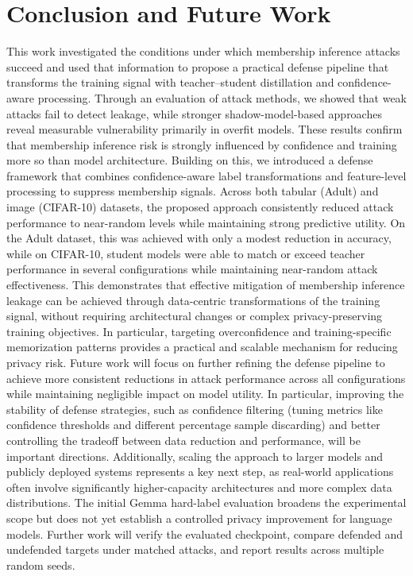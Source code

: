 \documentclass[conference]{IEEEtran}
\begin{document}
\section{Conclusion and Future Work}
This work investigated the conditions under which membership inference attacks succeed and used that information to propose a practical defense pipeline that transforms the training signal with teacher--student distillation and confidence-aware processing. Through an evaluation of attack methods, we showed that weak attacks fail to detect leakage, while stronger shadow-model-based approaches reveal measurable vulnerability primarily in overfit models. These results confirm that membership inference risk is strongly influenced by confidence and training more so than model architecture.
Building on this, we introduced a defense framework that combines confidence-aware label transformations and feature-level processing to suppress membership signals. Across both tabular (Adult) and image (CIFAR-10) datasets, the proposed approach consistently reduced attack performance to near-random levels while maintaining strong predictive utility. On the Adult dataset, this was achieved with only a modest reduction in accuracy, while on CIFAR-10, student models were able to match or exceed teacher performance in several configurations while maintaining near-random attack effectiveness.
This demonstrates that effective mitigation of membership inference leakage can be achieved through data-centric transformations of the training signal, without requiring architectural changes or complex privacy-preserving training objectives. In particular, targeting overconfidence and training-specific memorization patterns provides a practical and scalable mechanism for reducing privacy risk.
Future work will focus on further refining the defense pipeline to achieve more consistent reductions in attack performance across all configurations while maintaining negligible impact on model utility. In particular, improving the stability of defense strategies, such as confidence filtering (tuning metrics like confidence thresholds and different percentage sample discarding) and better controlling the tradeoff between data reduction and performance, will be important directions. Additionally, scaling the approach to larger models and publicly deployed systems represents a key next step, as real-world applications often involve significantly higher-capacity architectures and more complex data distributions.
The initial Gemma hard-label evaluation broadens the experimental scope but does not yet establish a controlled privacy improvement for language models. Further work will verify the evaluated checkpoint, compare defended and undefended targets under matched attacks, and report results across multiple random seeds.
\end{document}
